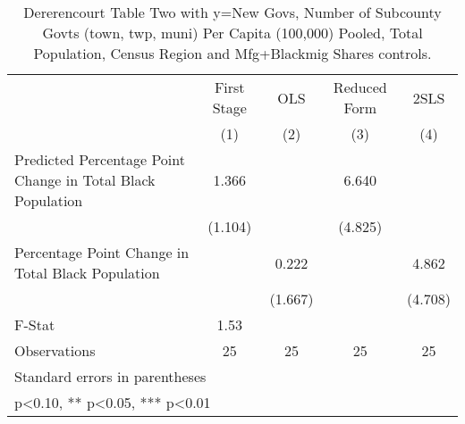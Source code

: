 \begin{table}[htbp]\centering
\def\sym#1{\ifmmode^{#1}\else\(^{#1}\)\fi}
\caption{Dererencourt Table Two with y=New Govs, Number of Subcounty Govts (town, twp, muni) Per Capita (100,000) Pooled, Total Population, Census Region and Mfg+Blackmig Shares controls.}
\begin{tabular}{l*{4}{c}}
\toprule
                    & First Stage   &         OLS   &Reduced Form   &        2SLS   \\
                    &\multicolumn{1}{c}{(1)}   &\multicolumn{1}{c}{(2)}   &\multicolumn{1}{c}{(3)}   &\multicolumn{1}{c}{(4)}   \\
\midrule
Predicted Percentage Point Change in Total Black Population&       1.366   &               &       6.640   &               \\
                    &     (1.104)   &               &     (4.825)   &               \\
\addlinespace
Percentage Point Change in Total Black Population&               &       0.222   &               &       4.862   \\
                    &               &     (1.667)   &               &     (4.708)   \\
\midrule
F-Stat              &        1.53   &               &               &               \\
Observations        &          25   &          25   &          25   &          25   \\
\bottomrule
\multicolumn{5}{l}{\footnotesize Standard errors in parentheses}\\
\multicolumn{5}{l}{\footnotesize * p<0.10, ** p<0.05, *** p<0.01}\\
\end{tabular}
\end{table}
